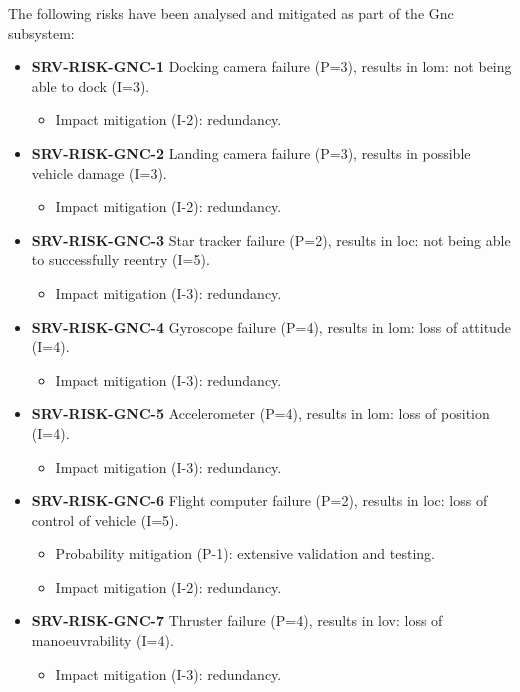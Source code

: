 \noindent The following risks have been analysed and mitigated as part of the Gnc subsystem:

\begin{itemize}
	 \item \textbf{SRV-RISK-GNC-1} Docking camera failure (P=3), results in lom: not being able to dock (I=3).
	\begin{itemize}
		 \item Impact mitigation (I-2):  redundancy.	\end{itemize}
	 \item \textbf{SRV-RISK-GNC-2} Landing camera failure (P=3), results in possible vehicle damage (I=3).
	\begin{itemize}
		 \item Impact mitigation (I-2):  redundancy.	\end{itemize}
	 \item \textbf{SRV-RISK-GNC-3} Star tracker failure (P=2), results in loc: not being able to successfully reentry (I=5).
	\begin{itemize}
		 \item Impact mitigation (I-3):  redundancy.	\end{itemize}
	 \item \textbf{SRV-RISK-GNC-4} Gyroscope failure (P=4), results in lom: loss of attitude (I=4).
	\begin{itemize}
		 \item Impact mitigation (I-3):  redundancy.	\end{itemize}
	 \item \textbf{SRV-RISK-GNC-5} Accelerometer (P=4), results in lom: loss of position (I=4).
	\begin{itemize}
		 \item Impact mitigation (I-3):  redundancy.	\end{itemize}
	 \item \textbf{SRV-RISK-GNC-6} Flight computer failure (P=2), results in loc: loss of control of vehicle (I=5).
	\begin{itemize}
		 \item Probability mitigation (P-1):  extensive validation and testing.		 \item Impact mitigation (I-2):  redundancy.	\end{itemize}
	 \item \textbf{SRV-RISK-GNC-7} Thruster failure (P=4), results in lov: loss of manoeuvrability (I=4).
	\begin{itemize}
		 \item Impact mitigation (I-3):  redundancy.	\end{itemize}

\end{itemize}
